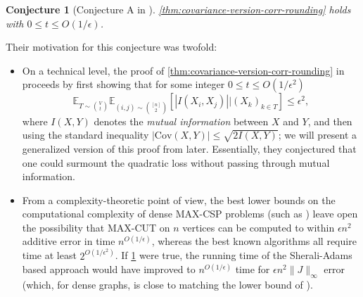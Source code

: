\documentclass[11pt, oneside, english]{article}
\newcommand{\bE}{\mathbb{E}}
\newcommand{\Cov}{\mathrm{Cov}}
\newcommand{\E}{\bE}      %
\newtheorem{conjecture}[theorem]{Conjecture}
\theoremstyle{definition}
\theoremstyle{plain}
\begin{document}
\begin{conjecture}[Conjecture A in \cite{allen2015conditioning}]
\label{conjecture:AOZ}
\cref{thm:covariance-version-corr-rounding} holds with $0\leq t\leq O(1/\epsilon)$.
\end{conjecture}
Their motivation for this conjecture was twofold: 
\begin{itemize}
\item On a technical level, the proof of \cref{thm:covariance-version-corr-rounding} in \cite{raghavendra-tan} proceeds by first showing that for some integer $0\leq t \leq O(1/\epsilon^{2})$
$$\E_{T \sim {V \choose t}} \E_{(i,j) \sim {[n] \choose 2}} \left[\left|I(X_i,X_j) \right| | (X_k)_{k\in T}\right] \leq \epsilon^{2},$$
where $I(X,Y)$ denotes the \emph{mutual information} between $X$ and $Y$, and then using the standard inequality $|\Cov(X,Y)| \leq \sqrt{2I(X,Y)}$; we will present a generalized version of this proof from \cite{manurangsi2017birthday,yoshida-zhou} later. Essentially, they conjectured that one could surmount the quadratic loss %
without passing through mutual information.
\item From a complexity-theoretic point of view, the best lower bounds on
the computational complexity of dense MAX-CSP problems (such as \cite{ailon2007hardness,manurangsi2017birthday}) leave open the possibility that MAX-CUT on $n$ vertices can be computed to within $\epsilon n^2$ additive error in time $n^{O(1/\epsilon)}$, whereas the best known algorithms all require time at least $2^{O(1/\epsilon^2)}$. If \cref{conjecture:AOZ} were true, the running time of the Sherali-Adams based approach would have improved to $n^{O(1/\epsilon)}$ time for $\epsilon n^2 \|J\|_{\infty}$ error (which, for dense graphs, is close to matching the lower bound of \cite{manurangsi2017birthday}).
\end{itemize}
\end{document}
